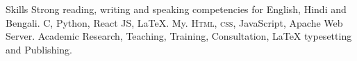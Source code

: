 \begin{rubric}{Skills}
\entry*[Languages]
	Strong reading, writing and speaking competencies for English, Hindi and Bengali.
	C, Python, React JS, LaTeX.
\entry*[Databases]
	My.
	\textsc{Html, css}, JavaScript, Apache Web Server.
\entry*[Misc.]
	Academic Research, Teaching, Training, Consultation, LaTeX typesetting and Publishing.
\end{rubric}
